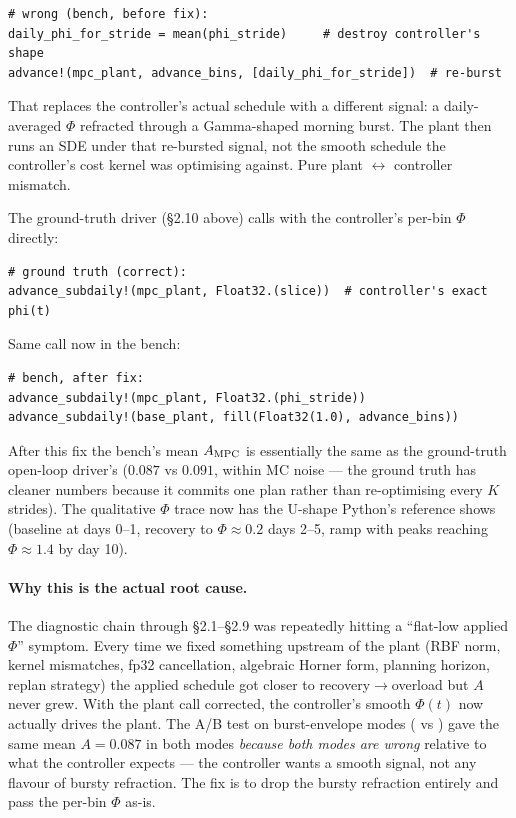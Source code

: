 \documentclass[11pt,a4paper]{article}
\begin{document}
\begin{verbatim}
# wrong (bench, before fix):
daily_phi_for_stride = mean(phi_stride)     # destroy controller's shape
advance!(mpc_plant, advance_bins, [daily_phi_for_stride])  # re-burst
\end{verbatim}

That replaces the controller's actual schedule with a different
signal: a daily-averaged $\Phi$ refracted through a Gamma-shaped
morning burst. The plant then runs an SDE under that re-bursted
signal, not the smooth schedule the controller's cost kernel was
optimising against. Pure plant $\leftrightarrow$ controller mismatch.

The ground-truth driver (\S 2.10 above) calls
 with the controller's per-bin $\Phi$
directly:

\begin{verbatim}
# ground truth (correct):
advance_subdaily!(mpc_plant, Float32.(slice))  # controller's exact phi(t)
\end{verbatim}

Same call now in the bench:

\begin{verbatim}
# bench, after fix:
advance_subdaily!(mpc_plant, Float32.(phi_stride))
advance_subdaily!(base_plant, fill(Float32(1.0), advance_bins))
\end{verbatim}

After this fix the bench's mean $A_{\rm MPC}$ is essentially the
same as the ground-truth open-loop driver's ($0.087$ vs $0.091$,
within MC noise --- the ground truth has cleaner numbers because
it commits one plan rather than re-optimising every $K$ strides).
The qualitative $\Phi$ trace now has the U-shape Python's reference
shows (baseline at days 0--1, recovery to $\Phi \approx 0.2$ days
2--5, ramp with peaks reaching $\Phi \approx 1.4$ by day 10).

\paragraph{Why this is the actual root cause.}
The diagnostic chain through \S 2.1--\S 2.9 was repeatedly hitting a
``flat-low applied $\Phi$'' symptom. Every time we fixed something
upstream of the plant (RBF norm, kernel mismatches, fp32 cancellation,
algebraic Horner form, planning horizon, replan strategy) the
applied schedule got closer to recovery$\to$overload but $A$
never grew. With the plant call corrected, the
controller's smooth $\Phi(t)$ now actually drives the plant. The
A/B test on burst-envelope modes ( vs
) gave the same mean $A = 0.087$ in both modes
\emph{because both modes are wrong} relative to what the controller
expects --- the controller wants a smooth signal, not any flavour
of bursty refraction. The fix is to drop the bursty refraction
entirely and pass the per-bin $\Phi$ as-is.
\end{document}

